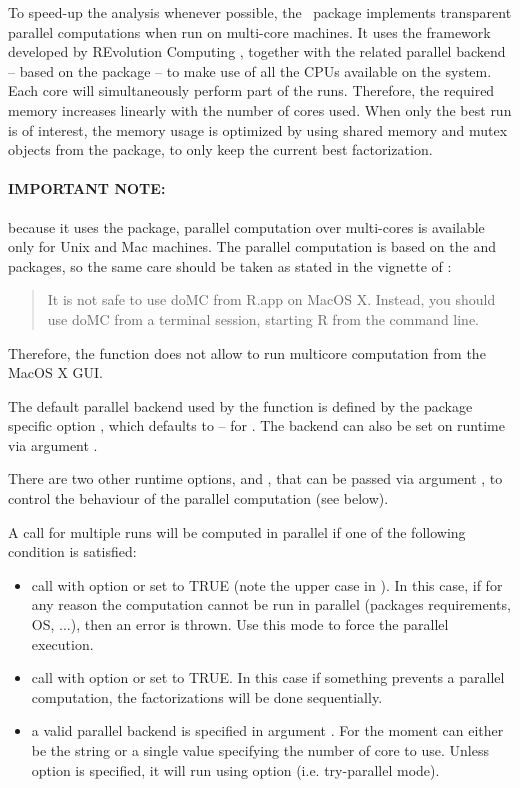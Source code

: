 \documentclass[a4paper]{article}
\newcommand{\nmfpack}{\code{NMF}\ }
\begin{document}
To speed-up the analysis whenever possible, the \nmfpack package implements 
transparent parallel computations when run on multi-core machines.
It uses the  framework developed by REvolution Computing \cite{foreach}, 
together with the related  parallel backend \cite{doMC} -- based 
on the  package -- to make use of all the CPUs available on the 
system.
Each core will simultaneously perform part of the runs. Therefore, the required 
memory increases linearly with the number of cores used.
When only the best run is of interest, the memory usage is optimized by using 
shared memory and mutex objects from the  package, to only keep the 
current best factorization.

\medskip
\paragraph{IMPORTANT NOTE:} because it uses the  package, 
parallel computation over multi-cores is available only for Unix and Mac machines.
The parallel computation is based on the  and  packages, 
so the same care should be taken as stated in the vignette of :
\begin{quote}
It is not safe to use doMC from R.app on MacOS X.
Instead, you should use doMC from a terminal session, starting R from the command line.
\end{quote}
Therefore, the  function does not allow to run multicore computation from the 
MacOS X GUI. 

\bigskip
The default parallel backend used by the  function is defined by the 
package specific option , which defaults to  
-- for .
The backend can also be set on runtime via argument .

There are two other runtime options,  
and , that can be passed via argument , 
to control the behaviour of the parallel computation (see below).

\medskip
A call for multiple runs will be computed in parallel if one of the 
following condition is satisfied:

\begin{itemize}
\item call with option  or  set to TRUE 
(note the upper case in ). In this case, if for any reason the 
computation cannot be run in parallel (packages requirements, OS, ...), 
then an error is thrown. Use this mode to force the parallel execution.
\item call with option  or  set to TRUE. In this case 
if something prevents a parallel computation, the factorizations will be done 
sequentially.
\item a valid parallel backend is specified in argument . For the 
moment can either be the string  or a single  value 
specifying the number of core to use. Unless option  is specified, it 
will run using option  (i.e. try-parallel mode).
\end{itemize}
\end{document}
